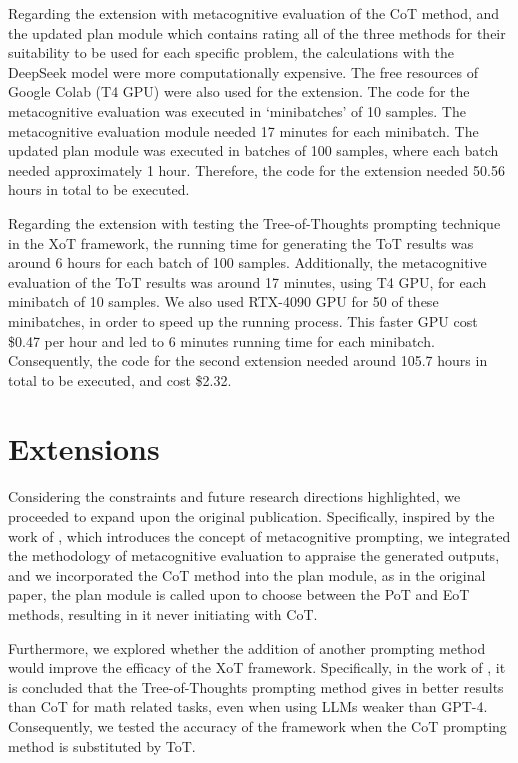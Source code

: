 \documentclass[10pt]{article} %
\begin{document}
Regarding the extension with metacognitive evaluation of the CoT method, and the updated plan module which contains rating all of the three methods for their suitability to be used for each specific problem, the calculations with the DeepSeek model were more computationally expensive. The free resources of Google Colab (T4 GPU) were also used for the extension. The code for the metacognitive evaluation was executed in `minibatches' of 10 samples. The metacognitive evaluation module needed 17 minutes for each minibatch. The updated plan module was executed in batches of 100 samples, where each batch needed approximately 1 hour. Therefore, the code for the extension needed 50.56 hours in total to be executed.

Regarding the extension with testing the Tree-of-Thoughts prompting technique in the XoT framework, the running time for generating the ToT results was around 6 hours for each batch of 100 samples. Additionally, the metacognitive evaluation of the ToT results was around 17 minutes, using T4 GPU, for each minibatch of 10 samples. We also used RTX-4090 GPU for 50 of these minibatches, in order to speed up the running process. This faster GPU cost \$0.47 per hour and led to 6 minutes running time for each minibatch. Consequently, the code for the second extension needed around 105.7 hours in total to be executed, and cost \$2.32.

\section{Extensions}
Considering the constraints and future research directions highlighted, we proceeded to expand upon the original publication. Specifically, inspired by the work of \citet{wang2023metacognitive}, which introduces the concept of metacognitive prompting, we integrated the methodology of metacognitive evaluation to appraise the generated outputs, and we incorporated the CoT method into the plan module, as in the original paper, the plan module is called upon to choose between the PoT and EoT methods, resulting in it never initiating with CoT.

Furthermore, we explored whether the addition of another prompting method would improve the efficacy of the XoT framework. Specifically, in the work of \citet{yao2023tree}, it is concluded that the Tree-of-Thoughts prompting method gives in better results than CoT for math related tasks, even when using LLMs weaker than GPT-4. Consequently, we tested the accuracy of the framework when the CoT prompting method is substituted by ToT.
\end{document}
